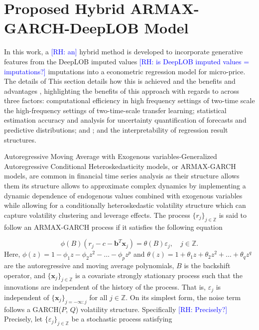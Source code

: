 \documentclass[10pt,a4paper,oneside]{article}
\newcommand{\Z}{\mathbb{Z}}
\newcommand{\rh}[1]{\textcolor{blue}{\textsf{[RH: #1]}}}
\providecommand{\DIFaddtex}[1]{{\protect\color{blue} \sf #1}} %
\providecommand{\DIFdeltex}[1]{{\protect\color{red} \scriptsize #1}} %
\providecommand{\DIFaddbegin}{} %
\providecommand{\DIFaddend}{} %
\providecommand{\DIFdelbegin}{} %
\providecommand{\DIFdelend}{} %
\providecommand{\DIFadd}[1]{\texorpdfstring{\DIFaddtex{#1}}{#1}} %
\providecommand{\DIFdel}[1]{\texorpdfstring{\DIFdeltex{#1}}{}} %
\newcommand{\DIFscaledelfig}{0.5}
\newlength{\DIFdelgraphicswidth} %
\newlength{\DIFdelgraphicsheight} %
\newcommand{\DIFaddincludegraphics}[2][]{{\color{blue}\fbox{\DIFOincludegraphics[#1]{#2}}}} %
\newcommand{\DIFdelincludegraphics}[2][]{%
\sbox{\DIFdelgraphicsbox}{\DIFOincludegraphics[#1]{#2}}%
\settoboxwidth{\DIFdelgraphicswidth}{\DIFdelgraphicsbox} %
\settoboxtotalheight{\DIFdelgraphicsheight}{\DIFdelgraphicsbox} %
\scalebox{\DIFscaledelfig}{%
\parbox[b]{\DIFdelgraphicswidth}{\usebox{\DIFdelgraphicsbox}\\[-\baselineskip] \rule{\DIFdelgraphicswidth}{0em}}\llap{\resizebox{\DIFdelgraphicswidth}{\DIFdelgraphicsheight}{%
\setlength{\unitlength}{\DIFdelgraphicswidth}%
\begin{picture}(1,1)%
\thicklines\linethickness{2pt} %
{\color[rgb]{1,0,0}\put(0,0){\framebox(1,1){}}}%
{\color[rgb]{1,0,0}\put(0,0){\line( 1,1){1}}}%
{\color[rgb]{1,0,0}\put(0,1){\line(1,-1){1}}}%
\end{picture}%
}\hspace*{3pt}}} %
} %
\DeclareRobustCommand{\DIFaddbegin}{\DIFOaddbegin \let\includegraphics\DIFaddincludegraphics} %
\DeclareRobustCommand{\DIFaddend}{\DIFOaddend \let\includegraphics\DIFOincludegraphics} %
\DeclareRobustCommand{\DIFdelbegin}{\DIFOdelbegin \let\includegraphics\DIFdelincludegraphics} %
\DeclareRobustCommand{\DIFdelend}{\DIFOaddend \let\includegraphics\DIFOincludegraphics} %
\begin{document}
\section{Proposed Hybrid ARMAX-GARCH-DeepLOB Model}
\label{subsec:armax_garch_paper}
In this work, a \DIFdelbegin \DIFdel{\rh{an} }\DIFdelend hybrid method is developed to incorporate generative features from the DeepLOB \DIFdelbegin \DIFdel{imputed values \rh{is DeepLOB imputed values = imputations?} }\DIFdelend \DIFaddbegin \DIFadd{imputations }\DIFaddend into a econometric regression model for micro-price. \DIFdelbegin \DIFdel{The details of }\DIFdelend \DIFaddbegin \DIFadd{This section details }\DIFaddend how this is achieved\DIFdelbegin \DIFdel{and the benefits and advantages }\DIFdelend \DIFaddbegin \DIFadd{, highlighting the benefits }\DIFaddend of this approach \DIFdelbegin \DIFdel{with regards to }\DIFdelend \DIFaddbegin \DIFadd{across }\DIFaddend three factors: computational efficiency in \DIFdelbegin \DIFdel{high frequency settings of two-time scale }\DIFdelend \DIFaddbegin \DIFadd{the high-frequency settings of two-time-scale }\DIFaddend transfer learning; statistical estimation accuracy and analysis for uncertainty quantification of forecasts\DIFdelbegin \DIFdel{and predictive distributions; and }\DIFdelend \DIFaddbegin \DIFadd{; and the }\DIFaddend interpretability of regression result structures.

Autoregressive Moving Average with Exogenous variables-Generalized Autoregressive Conditional Heteroskedasticity models, or ARMAX-GARCH models, are common in financial time series analysis as \DIFdelbegin \DIFdel{their structure allows them }\DIFdelend \DIFaddbegin \DIFadd{its structure allows }\DIFaddend to approximate complex dynamics by implementing a dynamic dependence of endogenous values combined with exogenous variables while allowing for a conditionally heteroskedastic volatility structure which can capture volatility clustering and leverage effects. The process $\{r_j\}_{j \in \Z}$ is said to follow an ARMAX-GARCH process if it satisfies the following equation

\begin{equation}
    \phi(B) \left( r_j - c - \mathbf{b}^T \mathbf{x}_j \right) = \theta(B) \varepsilon_j, \quad j \in \Z.
    \label{eq:armax}
\end{equation}
Here, $\phi(z) = 1 - \phi_1 z - \phi_2 z^2 - \dots - \phi_p z^p$ and $\theta(z) = 1 + \theta_1 z + \theta_2 z^2 + \dots + \theta_q z^q$ are the autoregressive and moving average polynomials, $B$ is the backshift operator, and $\{ \mathbf{x}_j \}_{j \in \Z}$ is a covariate strongly stationary process such that the innovations are independent of the history of the process. That is, $\varepsilon_j$ is independent of $\{ \mathbf{x}_j \}_{j = - \infty : j}$ for all $j \in \Z$. On its simplest form, the noise term follows a GARCH($P$, $Q$) volatility structure. \DIFdelbegin \DIFdel{Specifically \rh{Precisely?}}\DIFdelend \DIFaddbegin \DIFadd{Precisely}\DIFaddend , let $\{ \varepsilon_j \}_{j \in \Z}$ be a stochastic process satisfying
\end{document}
